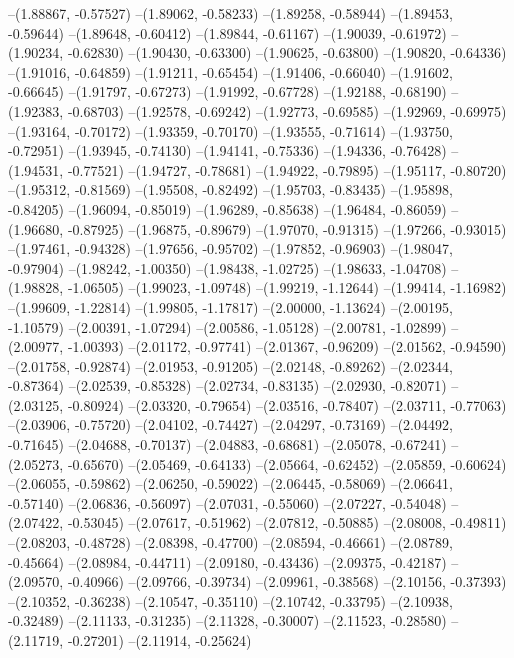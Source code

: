 --(1.88867, -0.57527)
--(1.89062, -0.58233)
--(1.89258, -0.58944)
--(1.89453, -0.59644)
--(1.89648, -0.60412)
--(1.89844, -0.61167)
--(1.90039, -0.61972)
--(1.90234, -0.62830)
--(1.90430, -0.63300)
--(1.90625, -0.63800)
--(1.90820, -0.64336)
--(1.91016, -0.64859)
--(1.91211, -0.65454)
--(1.91406, -0.66040)
--(1.91602, -0.66645)
--(1.91797, -0.67273)
--(1.91992, -0.67728)
--(1.92188, -0.68190)
--(1.92383, -0.68703)
--(1.92578, -0.69242)
--(1.92773, -0.69585)
--(1.92969, -0.69975)
--(1.93164, -0.70172)
--(1.93359, -0.70170)
--(1.93555, -0.71614)
--(1.93750, -0.72951)
--(1.93945, -0.74130)
--(1.94141, -0.75336)
--(1.94336, -0.76428)
--(1.94531, -0.77521)
--(1.94727, -0.78681)
--(1.94922, -0.79895)
--(1.95117, -0.80720)
--(1.95312, -0.81569)
--(1.95508, -0.82492)
--(1.95703, -0.83435)
--(1.95898, -0.84205)
--(1.96094, -0.85019)
--(1.96289, -0.85638)
--(1.96484, -0.86059)
--(1.96680, -0.87925)
--(1.96875, -0.89679)
--(1.97070, -0.91315)
--(1.97266, -0.93015)
--(1.97461, -0.94328)
--(1.97656, -0.95702)
--(1.97852, -0.96903)
--(1.98047, -0.97904)
--(1.98242, -1.00350)
--(1.98438, -1.02725)
--(1.98633, -1.04708)
--(1.98828, -1.06505)
--(1.99023, -1.09748)
--(1.99219, -1.12644)
--(1.99414, -1.16982)
--(1.99609, -1.22814)
--(1.99805, -1.17817)
--(2.00000, -1.13624)
--(2.00195, -1.10579)
--(2.00391, -1.07294)
--(2.00586, -1.05128)
--(2.00781, -1.02899)
--(2.00977, -1.00393)
--(2.01172, -0.97741)
--(2.01367, -0.96209)
--(2.01562, -0.94590)
--(2.01758, -0.92874)
--(2.01953, -0.91205)
--(2.02148, -0.89262)
--(2.02344, -0.87364)
--(2.02539, -0.85328)
--(2.02734, -0.83135)
--(2.02930, -0.82071)
--(2.03125, -0.80924)
--(2.03320, -0.79654)
--(2.03516, -0.78407)
--(2.03711, -0.77063)
--(2.03906, -0.75720)
--(2.04102, -0.74427)
--(2.04297, -0.73169)
--(2.04492, -0.71645)
--(2.04688, -0.70137)
--(2.04883, -0.68681)
--(2.05078, -0.67241)
--(2.05273, -0.65670)
--(2.05469, -0.64133)
--(2.05664, -0.62452)
--(2.05859, -0.60624)
--(2.06055, -0.59862)
--(2.06250, -0.59022)
--(2.06445, -0.58069)
--(2.06641, -0.57140)
--(2.06836, -0.56097)
--(2.07031, -0.55060)
--(2.07227, -0.54048)
--(2.07422, -0.53045)
--(2.07617, -0.51962)
--(2.07812, -0.50885)
--(2.08008, -0.49811)
--(2.08203, -0.48728)
--(2.08398, -0.47700)
--(2.08594, -0.46661)
--(2.08789, -0.45664)
--(2.08984, -0.44711)
--(2.09180, -0.43436)
--(2.09375, -0.42187)
--(2.09570, -0.40966)
--(2.09766, -0.39734)
--(2.09961, -0.38568)
--(2.10156, -0.37393)
--(2.10352, -0.36238)
--(2.10547, -0.35110)
--(2.10742, -0.33795)
--(2.10938, -0.32489)
--(2.11133, -0.31235)
--(2.11328, -0.30007)
--(2.11523, -0.28580)
--(2.11719, -0.27201)
--(2.11914, -0.25624)

